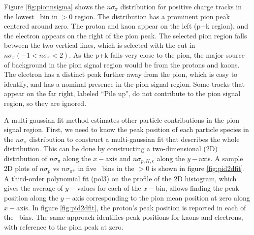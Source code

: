 
Figure \ref{fig:pionnsigma} shows the $n\sigma_\pi$ distribution for positive charge tracks in the lowest \ptp\ bin in \etap$>0$ region. The distribution has a prominent pion peak centered around zero. The proton and kaon appear on the left (p+k region), and the electron appears on the right of the pion peak. The selected pion region falls between the two vertical lines, which is selected with the cut in $n\sigma_\pi (-1<n\sigma_{\pi}<2)$. As the p+k falls very close to the pion, the major source of background in the pion signal region would be from the protons and kaons. The electron has a  distinct peak further away from the pion, which is easy to identify, and has a nominal presence in the pion signal region. Some tracks that appear on the far right, labeled ``Pile up", do not contribute to the pion signal region, so they are ignored.

A multi-gaussian fit method estimates other particle contributions in the pion signal region. First, we need to know the peak position of each particle species in the $n\sigma_\pi$ distribution to construct a multi-gaussian fit that describes the whole distribution. This can be done by constructing a two-dimensional (2D) distribution of $n\sigma_\pi$ along the $x-$axis and $n\sigma_{p, K, e}$ along the $y-$axis. A sample 2D plots of $n\sigma_p$ vs $n\sigma_{\pi^+}$ in five \ptp\ bins in the \etap$>0$ is shown in figure \ref{fig:pid2dfit}. A third-order polynomial fit (pol3) on the profile of the 2D histogram, which gives the average of $y-$values for each of the $x-$bin, allows finding the peak position along the $y-$axis corresponding to the pion mean position at zero along $x-$axis. In figure \ref{fig:pid2dfit}, the proton's peak position is reported in each of the \ptp\ bins. The same approach identifies peak positions for kaons and electrons, with reference to the pion peak at zero. 
    
   
    
